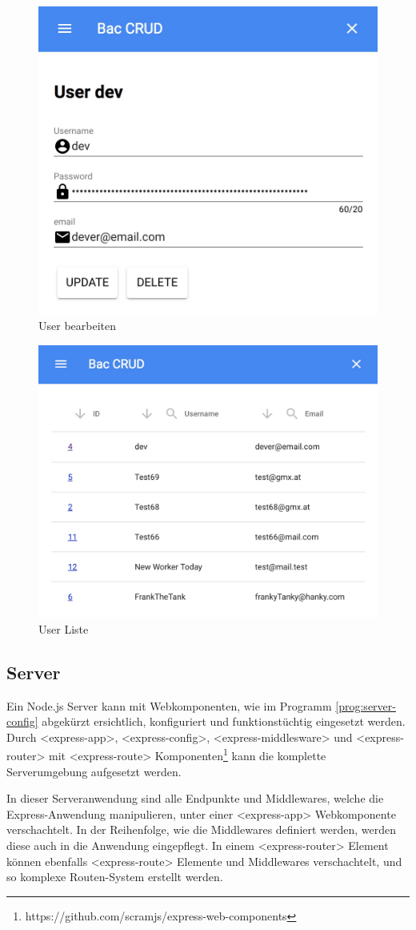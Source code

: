 \begin{figure}
	\centering
	\includegraphics[width=0.5\linewidth]{images/user_update.jpeg}
	\caption{User bearbeiten}
	\label{fig:user_update}
\end{figure}

\begin{figure}
	\centering
	\includegraphics[width=0.5\linewidth]{images/user_list.jpeg}
	\caption{User Liste}
	\label{fig:user_list}
\end{figure}

\subsection{Server}
Ein Node.js Server kann mit Webkomponenten, wie im Programm \ref{prog:server-config} abgekürzt ersichtlich, konfiguriert und funktionstüchtig eingesetzt werden. Durch <express-app>, <express-config>, <express-middlesware> und <express-router> mit <express-route> Komponenten\footnote{https://github.com/scramjs/express-web-components} kann die komplette Serverumgebung aufgesetzt werden.

In dieser Serveranwendung sind alle Endpunkte und Middlewares, welche die Express-Anwendung manipulieren, unter einer <express-app> Webkomponente  verschachtelt. In der Reihenfolge, wie die Middlewares definiert werden, werden diese auch in die Anwendung eingepflegt. In einem <express-router> Element können ebenfalls <express-route> Elemente und Middlewares verschachtelt, und so komplexe Routen-System erstellt werden.

